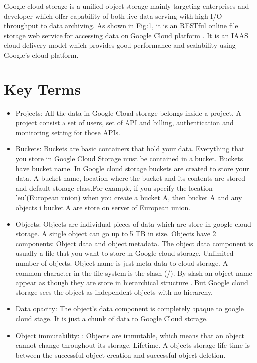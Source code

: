 \documentclass[9pt,twocolumn,twoside]{styles/osajnl}
\begin{document}
Google cloud storage is a unified object storage mainly targeting enterprises and developer which offer capability of both live data serving with high I/O throughput to data archiving. 
As shown in Fig:1, it is an RESTful online file storage web service for accessing data on Google Cloud platform \cite{www-google-cloud-storage-wiki}. It is an IAAS cloud delivery model which provides good performance and scalability using Google's cloud platform. 

\section{Key Terms}
\begin{itemize}


\item Projects: 
All the data in Google Cloud storage belongs inside a project. A project consist a set of users, set of API and billing, authentication and monitoring setting for those APIs.\cite{www-google-cloud-storage} 


\item Buckets:
Buckets are basic containers that hold your data. Everything that you store in Google Cloud Storage must be contained in a bucket. Buckets have bucket name. In Google cloud storage buckets are created to store your data. A bucket name, location where the bucket and its contents are stored and  default storage class.For example, if you specify the location 'eu'(European union)  when you create a bucket A, then bucket A and any objects i bucket A are store on server of European union. 


\item Objects:
Objects are individual pieces of data which are store in google cloud storage. A single object can go up to 5 TB in size. Objects have 2 components: Object data and object metadata. The object data component is usually a file that you want to store in Google cloud storage. Unlimited number of objects.
Object name is just meta data to cloud storage. A common character in the file system is the slash (/). By slash an object name appear as though they are store in hierarchical structure . But Google cloud storage sees the object as independent objects with no hierarchy.
 

\item Data opacity: 
The object’s data component is completely opaque to google cloud stage. It is just a chunk of data to Google Cloud storage.

\item Object immutability: 
: Objects are immutable, which means that an object cannot change throughout its storage. Lifetime. A objects storage life time is between the successful object creation and successful object deletion. 
 

\end{itemize}
\end{document}
